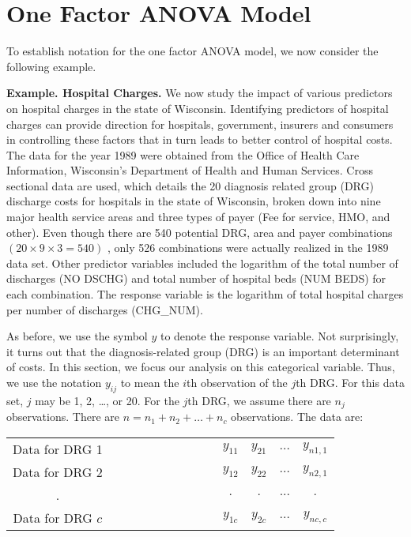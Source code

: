 \section{One Factor ANOVA Model}

To establish notation for the one factor ANOVA model, we now
consider the following example.

\linejed

\textbf{Example. Hospital Charges.} We
now study the impact of various predictors on hospital charges in
the state of Wisconsin. Identifying predictors of hospital charges
can provide direction for hospitals, government, insurers and
consumers in controlling these factors that in turn leads to better
control of hospital costs. The data for the year 1989 were obtained
from the Office of Health Care Information, Wisconsin's Department
of Health and Human Services. Cross sectional data are used, which
details the 20 diagnosis related group (DRG) discharge costs for
hospitals in the state of Wisconsin, broken down into nine major
health service areas and three types of payer (Fee for service, HMO,
and other). Even though there
are 540 potential DRG, area and payer combinations $(20\times 9\times 3=540)$%
, only 526 combinations were actually realized in the 1989 data set. Other
predictor variables included the logarithm of the total number of discharges
(NO DSCHG) and total number of hospital beds (NUM BEDS) for each
combination. The response variable is the logarithm of total hospital
charges per number of discharges (CHG\_NUM).

As before, we use the symbol $y$ to denote the response variable.
Not surprisingly, it turns out that the diagnosis-related group
(DRG) is an important determinant of costs. In this section, we
focus our analysis on this categorical variable. Thus, we use the
notation $y_{ij}$ to mean the $i$th observation of the $j$th DRG.
For this data set, $j$ may be 1, 2, \ldots , or 20. For the $j$th
DRG, we assume there are $n_{j}$ observations. There are
$n=n_{1}+n_{2}+\ldots +n_{c}$ observations. The data are:

\begin{center}
\begin{tabular}{cccccc}
Data for DRG 1 & \ \ \ \ \ \ \ \ \ \ \ \ \ \ \  & $y_{11}$ & $y_{21}$ & $%
\ldots $ & $y_{n1,1}$ \\
Data for DRG 2 &  & $y_{12}$ & $y_{22}$ & $\ldots $ & $y_{n2,1}$ \\
. &  & $.$ & $.$ & $...$ & $.$ \\
Data for DRG $c$ &  & $y_{1c}$ & $y_{2c}$ & $\ldots $ & $y_{nc,c}$%
\end{tabular}
\end{center}

